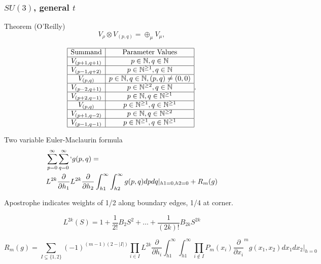 \documentclass{beamer}
\def\N{{\mathbb N}}
\begin{document}
\begin{frame}
	\frametitle{$SU(3)$, general $t$}
	\begin{block}{Theorem (O'Reilly)}
\begin{equation}
V_{\rho} \otimes V_{(p,q)} = \oplus_{\mu} V_{\mu},
\end{equation}

\begin{equation}
\begin{array}{|c|c|}
\hline
\mathrm{Summand} & \mathrm{Parameter~Values}\\
\hline
V_{(p+1,q+1)} & p \in \N, q \in \N\\
\hline
V_{(p-1,q+2)} & p \in \N^{\geq 1}, q \in \N\\
\hline
V_{(p,q)} & p \in \N, q \in \N, (p,q)\neq (0,0) \\
\hline
V_{(p-2,q+1)} & p \in \N^{\geq 2}, q \in \N\\
\hline
V_{(p+2,q-1)} & p \in \N, q \in \N^{\geq 1} \\
\hline
V_{(p,q)} & p \in \N^{\geq 1}, q \in \N^{\geq 1} \\
\hline
V_{(p+1,q-2)} & p \in \N, q \in \N^{\geq 2} \\
\hline
V_{(p-1,q-1)} & p \in \N^{\geq 1}, q \in \N^{\geq 1} \\
\hline
\end{array} .
\end{equation}
	\end{block}
\end{frame}

\begin{frame}
  \begin{block}{Two variable Euler-Maclaurin formula}
    \begin{align*}
      &\sum_{p=0}^{\infty} \sum_{q=0}^{\infty} ` g(p,q) =\\
      &L^{2k} \frac{\partial}{\partial h_1}L^{2k} \frac{\partial}{\partial h_2} \int_{h1}^{\infty} \int_{h2}^{\infty} g(p,q)dpdq|_{h1=0, h2 = 0} + R_m(g) \\
    \end{align*}

    {\tiny
    Apostrophe indicates weights of 1/2 along boundary edges, 1/4 at corner.

    \[
      L^{2k}(S) = 1 + \frac{1}{2!}B_2S^2+ \ldots + \frac{1}{(2k)!} B_{2k}S^{2k}
    \]
    
    \[
      R_m(g) = \sum_{I \subsetneq \{1,2\}}(-1)^{(m-1)(2-|I|)}\prod_{i\in I} L^{2k} \frac{\partial}{\partial h_i} \int_{h1}^{\infty}\int_{h1}^{\infty} \prod_{i \notin I} P_m(x_i) \frac{\partial}{\partial x_i} ^m g(x_1,x_2)dx_1 dx_2 |_{h=0}
    \]
    }
  \end{block}
\end{frame}
\end{document}
